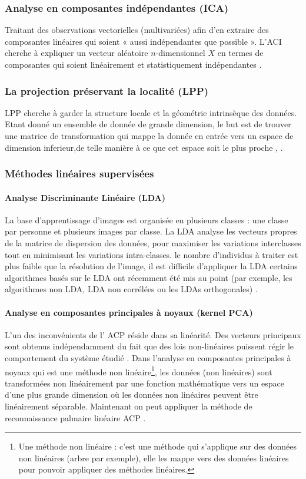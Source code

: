 \subsubsection{Analyse en composantes indépendantes (ICA)}
Traitant des observations vectorielles (multivariées) afin d’en extraire des composantes linéaires qui soient « aussi indépendantes que possible ». L’ACI cherche à expliquer un vecteur aléatoire $ n $-dimensionnel $ X $ en termes de composantes qui soient linéairement et statistiquement indépendantes \citep{cardoso2002analyse}.
\subsubsection{La projection préservant la localité (LPP)}
LPP cherche à garder la structure locale et la géométrie intrinsèque des données. Etant donné un ensemble de donnée de grande dimension, le but est de trouver une matrice de transformation qui mappe la donnée en entrée vers un espace de dimension inferieur,de telle manière à ce que cet espace soit le plus proche \citep{he2004locality}, \citep{lu2008palmprint}.
\subsubsection{Méthodes linéaires supervisées }
\paragraph{Analyse Discriminante Linéaire (LDA)}
La base d’apprentissage d’images est organisée en plusieurs classes : une classe par personne et plusieurs images par classe. La  LDA  analyse les vecteurs propres de la matrice de dispersion des données, pour  maximiser les variations interclasses tout en minimisant les variations intra-classes.
le nombre d’individus à traiter est plus faible que la résolution de l’image, il est difficile d’appliquer la  LDA  certains algorithmes basés sur le  LDA  ont récemment  été mis au point (par exemple, les algorithmes non LDA, LDA non corrélées ou les LDAs orthogonales) \citep{morizet2006revue}.
\paragraph{Analyse en composantes principales à noyaux (kernel  PCA)}
L’un des inconvénients de l’ ACP  réside dans sa linéarité. Des vecteurs principaux sont obtenus indépendamment du fait que des lois non-linéaires puissent régir le comportement du système étudié \citep{honeine2007methodes}. Dans l’analyse en composantes principales à noyaux qui est une méthode non linéaire\footnote{Une méthode non linéaire : c’est une méthode qui s’applique sur des données non linéaires (arbre par exemple), elle les mappe vers des données linéaires pour pouvoir appliquer des méthodes linéaires.}, les données (non linéaires) sont transformées non linéairement par une fonction mathématique vers un espace d’une plus grande dimension où les données non linéaires peuvent être linéairement séparable.
Maintenant on peut appliquer la méthode de reconnaissance palmaire linéaire  ACP . 

